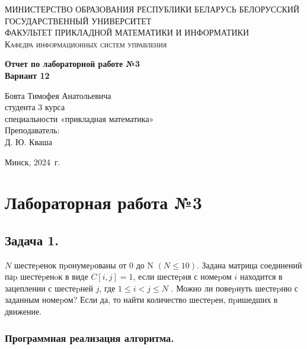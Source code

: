 \documentclass[a4paper, 12pt]{report}
\renewcommand{\leq}{\leqslant}
\begin{document}
	\begin{titlepage}
		\begin{center}
			\textsc{МИНИСТЕРСТВО ОБРАЗОВАНИЯ РЕСПУБЛИКИ БЕЛАРУСЬ БЕЛОРУССКИЙ ГОСУДАРСТВЕННЫЙ УНИВЕРСИТЕТ
				\\[5mm]
				ФАКУЛЬТЕТ ПРИКЛАДНОЙ МАТЕМАТИКИ И ИНФОРМАТИКИ\\[2mm]
				Кафедра информационных систем управления
			}
			
			\vfill
			
			\textbf{Отчет по лабораторной работе №3\\
				Вариант 12
				\\[26mm]
			}
		\end{center}
		
		\hfill
		\begin{minipage}{.5\textwidth}
			\begin{flushright}
				Бовта Тимофея Анатольевича\\
				студента 3 курса\\
				специальности «прикладная математика»\\[5mm]
				
				Преподаватель:\\[2mm] 
				Д. Ю. Кваша\\
			\end{flushright}
		\end{minipage}%
		\vfill
		\begin{center}
			Минск, 2024\ г.
		\end{center}
	\end{titlepage}
	\newpage
	\section*{Лабораторная работа №3}
	\subsection*{Задача 1.}
	$N$ шестеpенок пpонумеpованы от 0 до N $(N\leq 10)$. Задана матрица соединений паp шестеpенoк в виде $C[i,j]=1$, если шестеpня с номеpом $i$ находится в зацеплении с шестеpней $j$, где $1\leq i<j\leq N$ . Можно ли повеpнуть шестеpню с заданным номеpом? Если да, то найти количество шестеpен, пpишедших в движение.
	\subsubsection*{Программная реализация алгоритма.}
\end{document}

